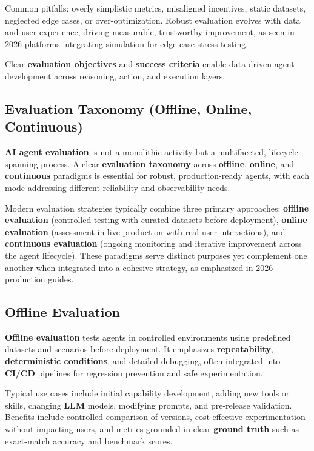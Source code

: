 \begin{TNtwocol}
Common pitfalls: overly simplistic metrics, misaligned incentives, static datasets, neglected edge cases, or over-optimization. Robust evaluation evolves with data and user experience, driving measurable, trustworthy improvement, as seen in 2026 platforms integrating simulation for edge-case stress-testing.
​

Clear \textbf{evaluation objectives} and \textbf{success criteria} enable data-driven agent development across reasoning, action, and execution layers.

\end{TNtwocol}
\begin{TNtwocol}
\section{Evaluation Taxonomy (Offline, Online, Continuous)}

\textbf{AI agent evaluation} is not a monolithic activity but a multifaceted, lifecycle-spanning process. A clear \textbf{evaluation taxonomy} across \textbf{offline}, \textbf{online}, and \textbf{continuous} paradigms is essential for robust, production-ready agents, with each mode addressing different reliability and observability needs.

Modern evaluation strategies typically combine three primary approaches: \textbf{offline evaluation} (controlled testing with curated datasets before deployment), \textbf{online evaluation} (assessment in live production with real user interactions), and \textbf{continuous evaluation} (ongoing monitoring and iterative improvement across the agent lifecycle). These paradigms serve distinct purposes yet complement one another when integrated into a cohesive strategy, as emphasized in 2026 production guides.
​

\subsection*{Offline Evaluation}

\textbf{Offline evaluation} tests agents in controlled environments using predefined datasets and scenarios before deployment. It emphasizes \textbf{repeatability}, \textbf{deterministic conditions}, and detailed debugging, often integrated into \textbf{CI/CD} pipelines for regression prevention and safe experimentation.

Typical use cases include initial capability development, adding new tools or skills, changing \textbf{LLM} models, modifying prompts, and pre-release validation. Benefits include controlled comparison of versions, cost-effective experimentation without impacting users, and metrics grounded in clear \textbf{ground truth} such as exact-match accuracy and benchmark scores.


\end{TNtwocol}
